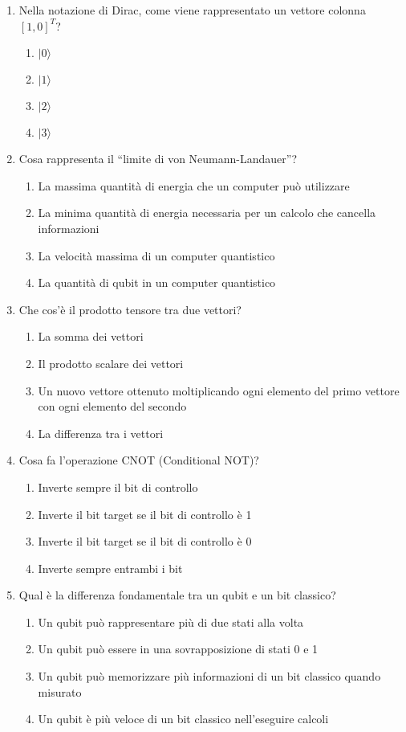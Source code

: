\documentclass[10pt]{article}
\begin{document}
\begin{enumerate}[label=\textbf{Domanda \arabic*.}]
\item Nella notazione di Dirac, come viene rappresentato un vettore colonna \([1, 0]^T\)?
    \begin{enumerate}[label=\Alph*.]
        \item \(|0\rangle\)
        \item \(|1\rangle\)
        \item \(|2\rangle\)
        \item \(|3\rangle\)
    \end{enumerate}


\item Cosa rappresenta il ``limite di von Neumann-Landauer''?
\begin{enumerate}[label=\Alph*.]
    \item La massima quantità di energia che un computer può utilizzare
    \item La minima quantità di energia necessaria per un calcolo che cancella informazioni
    \item La velocità massima di un computer quantistico
    \item La quantità di qubit in un computer quantistico
\end{enumerate}


\item Che cos'è il prodotto tensore tra due vettori?
\begin{enumerate}[label=\Alph*.]
    \item La somma dei vettori
    \item Il prodotto scalare dei vettori
    \item Un nuovo vettore ottenuto moltiplicando ogni elemento del primo vettore con ogni elemento del secondo
    \item La differenza tra i vettori
\end{enumerate}


\item Cosa fa l'operazione CNOT (Conditional NOT)?
\begin{enumerate}[label=\Alph*.]
    \item Inverte sempre il bit di controllo
    \item Inverte il bit target se il bit di controllo è 1
    \item Inverte il bit target se il bit di controllo è 0
    \item Inverte sempre entrambi i bit
\end{enumerate}


\item Qual è la differenza fondamentale tra un qubit e un bit classico?
\begin{enumerate}[label=\Alph*.]
\item Un qubit può rappresentare più di due stati alla volta
\item Un qubit può essere in una sovrapposizione di stati 0 e 1
\item Un qubit può memorizzare più informazioni di un bit classico quando misurato
\item Un qubit è più veloce di un bit classico nell'eseguire calcoli
\end{enumerate}



\end{enumerate}
\end{document}
